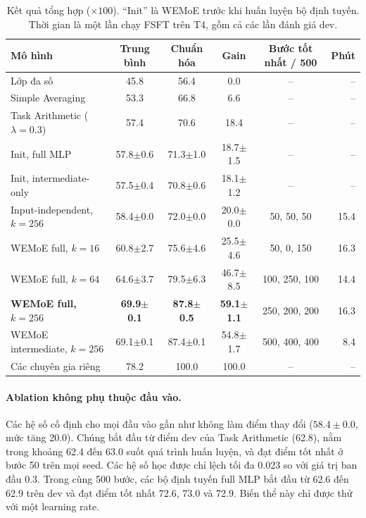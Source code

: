 \begin{table}[htbp]
  \centering\tablestyle
  \caption{Kết quả tổng hợp ($\times100$). ``Init'' là WEMoE trước khi huấn luyện bộ định tuyến. Thời gian là một lần chạy FSFT trên T4, gồm cả các lần đánh giá dev.}
  \label{tab:main}
  \begin{tabular}{l c c c c r}
    \toprule
    Mô hình & Trung bình & Chuẩn hóa & Gain & Bước tốt nhất / 500 & Phút\\
    \midrule
    Lớp đa số & 45.8 & 56.4 & 0.0 & -- & --\\
    Simple Averaging & 53.3 & 66.8 & 6.6 & -- & --\\
    Task Arithmetic ($\lambda=0.3$) & 57.4 & 70.6 & 18.4 & -- & --\\
    Init, full MLP & 57.8$\pm$0.6 & 71.3$\pm$1.0 & 18.7$\pm$1.5 & -- & --\\
    Init, intermediate-only & 57.5$\pm$0.4 & 70.8$\pm$0.6 & 18.1$\pm$1.2 & -- & --\\
    Input-independent, $k=256$ & 58.4$\pm$0.0 & 72.0$\pm$0.0 & 20.0$\pm$0.0 & 50, 50, 50 & 15.4\\
    WEMoE full, $k=16$ & 60.8$\pm$2.7 & 75.6$\pm$4.6 & 25.5$\pm$4.6 & 50, 0, 150 & 16.3\\
    WEMoE full, $k=64$ & 64.6$\pm$3.7 & 79.5$\pm$6.3 & 46.7$\pm$8.5 & 100, 250, 100 & 14.4\\
    \textbf{WEMoE full, $k=256$} & \textbf{69.9$\pm$0.1} & \textbf{87.8$\pm$0.5} & \textbf{59.1$\pm$1.1} & 250, 200, 200 & 16.3\\
    WEMoE intermediate, $k=256$ & 69.1$\pm$0.1 & 87.4$\pm$0.1 & 54.8$\pm$1.7 & 500, 400, 400 & 8.4\\
    Các chuyên gia riêng & 78.2 & 100.0 & 100.0 & -- & --\\
    \bottomrule
  \end{tabular}
\end{table}

\paragraph{Ablation không phụ thuộc đầu vào.} Các hệ số cố định cho mọi đầu vào gần như không làm điểm thay đổi ($58.4\pm0.0$, mức tăng 20.0). Chúng bắt đầu từ điểm dev của Task Arithmetic (62.8), nằm trong khoảng 62.4 đến 63.0 suốt quá trình huấn luyện, và đạt điểm tốt nhất ở bước 50 trên mọi seed. Các hệ số học được chỉ lệch tối đa 0.023 so với giá trị ban đầu 0.3. Trong cùng 500 bước, các bộ định tuyến full MLP bắt đầu từ 62.6 đến 62.9 trên dev và đạt điểm tốt nhất 72.6, 73.0 và 72.9. Biến thể này chỉ được thử với một learning rate.

